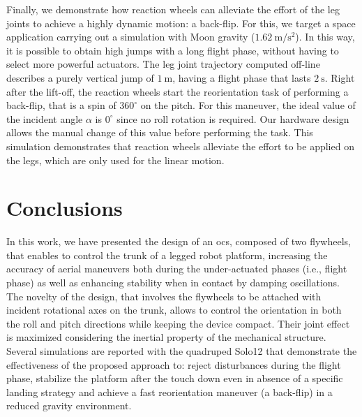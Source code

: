 \documentclass[letterpaper, 10 pt, conference]{ieeeconf}  %
\begin{document}



Finally, we demonstrate how reaction wheels can alleviate the effort of the leg joints to achieve a highly dynamic motion: a back-flip. 
For this, we target a space application carrying out a simulation with Moon gravity ($1.62 \ \mathrm{m/s^2}$).
In this way, it is possible to obtain high jumps with a long flight phase, without having to select more powerful actuators.  
The leg joint trajectory computed off-line describes a purely vertical jump of $1 \ \mathrm{m}$, having a flight phase that lasts $2 \ \mathrm{s}$.
Right after the lift-off, the reaction wheels start the reorientation task of performing a back-flip, that is a spin of $360^\circ$ on the pitch.
For this maneuver, the ideal value of the incident angle $\alpha$ is $0^\circ$ since no roll rotation is required.
Our hardware design allows the manual change of this value before performing the task.
This simulation demonstrates that reaction wheels alleviate the effort to be applied on the legs, which are only used for the linear motion.


\section{Conclusions}
\label{sec:conclusion}

In this work, we have presented the design of an \gls{ocs}, composed of two flywheels, that enables to control the trunk of a legged robot platform, 
increasing the accuracy of aerial maneuvers both during the under-actuated phases (i.e., flight phase) as well as 
enhancing stability when in contact by damping oscillations.
The novelty of the design, that involves the flywheels to be attached with incident rotational axes on the trunk, allows to control the orientation
in both the roll and pitch directions while keeping the device compact. Their joint effect is maximized considering the inertial property of the mechanical structure. 
Several simulations are reported with the quadruped Solo12 that demonstrate the effectiveness of the proposed approach to: 
reject disturbances during the flight phase, stabilize the platform after the touch down even in absence of a specific landing strategy and 
achieve a fast reorientation maneuver (a back-flip) in a reduced gravity environment. 
\end{document}
